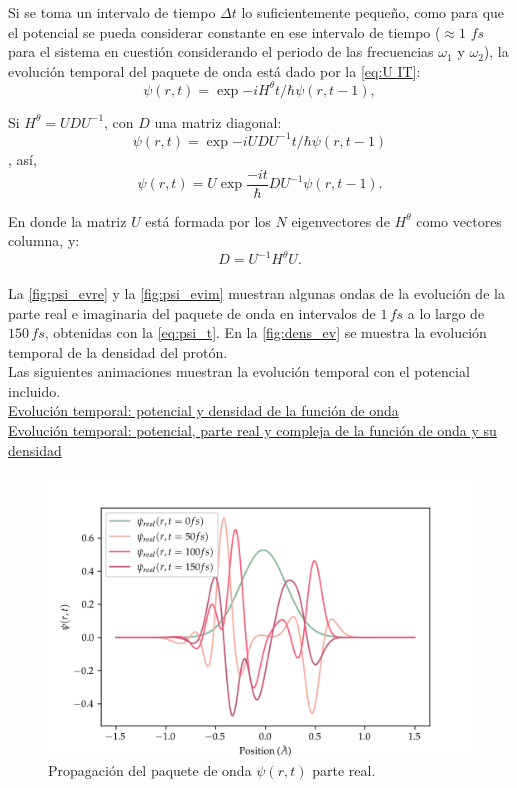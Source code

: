 Si se toma un intervalo de tiempo $\Delta t$ lo suficientemente pequeño, como para que el potencial se pueda considerar constante en ese intervalo de tiempo ($\approx 1\,\,fs$ para el sistema en cuestión considerando el periodo de las frecuencias $\omega_1$ y $\omega_2$), la evolución temporal del paquete de onda está dado por la \autoref{eq:U IT}:
\begin{equation}
  \label{eq:wp_ev}
  \psi(r,t)=\exp{-iH^{\theta}t/\hbar}\psi(r,t-1),
\end{equation}

Si $H^{\theta} = UDU^{-1}$, con $D$ una matriz diagonal:
$$ \psi(r,t) = \exp{-iUDU^{-1}t/\hbar}\psi(r,t-1)$$  ,
así,
\begin{equation}
  \label{eq:psi_t}
\psi(r,t) = U\exp{\frac{-it}{\hbar}D}U^{-1}\psi(r,t-1).
\end{equation}

En donde la matriz $U$ está formada por los $N$ eigenvectores de $H^{\theta}$ como vectores columna, y:
$$D=U^{-1}H^{\theta}U.$$
\\

La \autoref{fig:psi_evre} y la \autoref{fig:psi_evim} muestran algunas ondas de la evolución de la parte real e imaginaria del paquete de onda en intervalos de $1\,fs$ a lo largo de $150\,fs$, obtenidas con la \autoref{eq:psi_t}. En la \autoref{fig:dens_ev} se muestra la evolución temporal de la densidad del protón.\\
Las siguientes animaciones muestran la evolución temporal con el potencial incluido. \\
\href{https://github.com/Jessi-MM/LSTM_PropagatorLearning/blob/main/src/Animation/gifs/animation-dens%26pot.gif}{\faPlayCircle[regular] Evolución temporal: potencial y densidad de la función de onda} \\
\href{https://github.com/Jessi-MM/LSTM_PropagatorLearning/blob/main/src/Animation/gifs/animation-all.gif}{\faPlayCircle[regular] Evolución temporal: potencial, parte real y compleja de la función de onda y su densidad}

\begin{figure}[!htbp]
  \centering
  \includegraphics[width=1\textwidth]{./img/psi_ev1imag}
  \caption{Propagación del paquete de onda $\psi(r,t)$ parte real.}
  \label{fig:psi_evre}
\end{figure}

